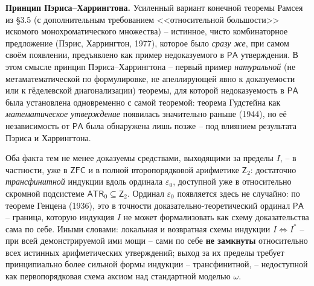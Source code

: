 \documentclass[12pt,a4paper]{article}
\theoremstyle{plain}
\theoremstyle{definition}
\newcommand{\PA}{\textsf{PA}}
\newcommand{\Ztwo}{\textsf{Z}_2}
\newcommand{\ZFC}{\textsf{ZFC}}
\begin{document}
\textbf{Принцип Пэриса--Харрингтона.} Усиленный вариант конечной теоремы Рамсея из §3.5 (с дополнительным требованием <<относительной большости>> искомого монохроматического множества) -- истинное, чисто комбинаторное предложение (Пэрис, Харрингтон, 1977), которое было \emph{сразу же}, при самом своём появлении, предъявлено как пример недоказуемого в $\PA$ утверждения. В этом смысле принцип Пэриса--Харрингтона -- первый пример \emph{натуральной} (не метаматематической по формулировке, не апеллирующей явно к доказуемости или к гёделевской диагонализации) теоремы, для которой недоказуемость в $\PA$ была установлена одновременно с самой теоремой: теорема Гудстейна как \emph{математическое утверждение} появилась значительно раньше (1944), но её независимость от $\PA$ была обнаружена лишь позже -- под влиянием результата Пэриса и Харрингтона.

Оба факта тем не менее доказуемы средствами, выходящими за пределы $I$, -- в частности, уже в $\ZFC$ и в полной второпорядковой арифметике $\Ztwo$: достаточно \emph{трансфинитной} индукции вдоль ординала $\varepsilon_0$, доступной уже в относительно скромной подсистеме $\textsf{ATR}_0\subseteq\Ztwo$. Ординал $\varepsilon_0$ появляется здесь не случайно: по теореме Генцена (1936), это в точности доказательно-теоретический ординал $\PA$ -- граница, которую индукция $I$ не может формализовать как схему доказательства сама по себе. Иными словами: локальная и возвратная схемы индукции $I\iff I^*$ -- при всей демонстрируемой ими мощи -- сами по себе \textbf{не замкнуты} относительно всех истинных арифметических утверждений; выход за их пределы требует принципиально более сильной формы индукции -- трансфинитной, -- недоступной как первопорядковая схема аксиом над стандартной моделью $\omega$.
\end{document}
